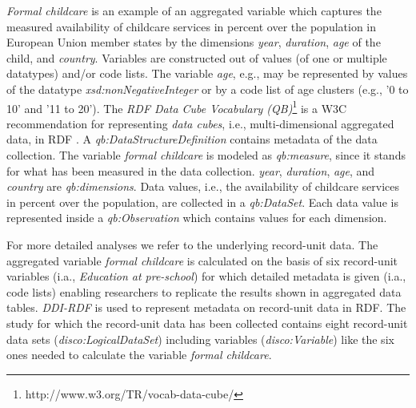 \documentclass[conference]{IEEEtran}
\newcommand{\ke}[1]{\todo[size=\small, color=red!40]{\textbf{Kai:} #1}}
\newcommand{\tb}[1]{\todo[size=\small, color=green!40]{\textbf{Thomas:} #1}}
\begin{document}
\emph{Formal childcare} is an example of an aggregated variable which captures the measured availability of childcare services in percent over the population in European Union member states by 
the dimensions \emph{year}, \emph{duration}, \emph{age} of the child, and \emph{country}.
Variables are constructed out of values (of one or multiple datatypes) and/or code lists.
The variable \emph{age}, e.g., may be represented by values of the datatype \emph{xsd:nonNegativeInteger} or by a code list of age clusters (e.g., '0 to 10' and '11 to 20'). 
The \emph{RDF Data Cube Vocabulary (QB)}\footnote{http://www.w3.org/TR/vocab-data-cube/} is a W3C recommendation for representing \emph{data cubes}, i.e., multi-dimensional aggregated data, in RDF \cite{Cyganiak2010}. 
A \emph{qb:DataStructureDefinition} contains metadata of the data collection.
The variable \emph{formal childcare} is modeled as \emph{qb:measure}, since it stands for what has been measured in the data collection.
\emph{year}, \emph{duration}, \emph{age}, and \emph{country} are \emph{qb:dimensions}.
Data values, i.e., the availability of childcare services in percent over the population, are collected in a \emph{qb:DataSet}. 
Each data value is represented inside a \emph{qb:Observation} which contains values for each dimension. 

For more detailed analyses we refer to the underlying record-unit data. The aggregated variable \emph{formal childcare} is calculated on the basis of six record-unit variables (i.a., \emph{Education at pre-school}) for which detailed metadata is given (i.a., code lists) enabling researchers to replicate the results shown in aggregated data tables.
\emph{DDI-RDF} is used to represent metadata on record-unit data in RDF.
The study for which the record-unit data has been collected 
contains eight record-unit data sets (\emph{disco:LogicalDataSet})
including variables (\emph{disco:Variable}) like the six ones needed to calculate the variable \emph{formal childcare}.
\end{document}
